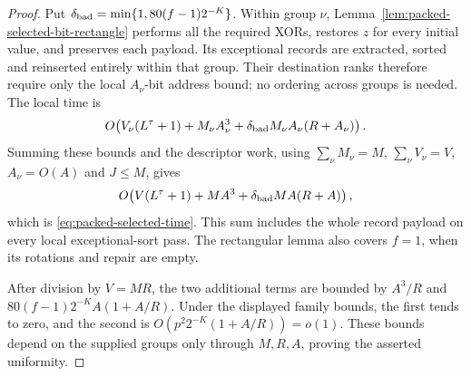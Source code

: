 \documentclass[11pt]{article}
\theoremstyle{definition}
\begin{document}
\begin{proof}
Put $\delta_{\rm bad}=\min\{1,80(f-1)2^{-K}\}$. Within group $\nu$,
Lemma~\ref{lem:packed-selected-bit-rectangle} performs all the required
XORs, restores $z$ for every initial value, and preserves each payload.
Its exceptional records are extracted, sorted and reinserted entirely
within that group. Their destination ranks therefore require only the
local $A_\nu$-bit address bound; no ordering across groups is needed.
The local time is
\[
 O\!\left(V_\nu(L^\tau+1)+M_\nu A_\nu^3+
       \delta_{\rm bad}M_\nu A_\nu(R+A_\nu)\right).
\]
Summing these bounds and the descriptor work, using
$\sum_\nu M_\nu=M$, $\sum_\nu V_\nu=V$, $A_\nu=O(A)$ and $J\le M$,
gives
\[
 O\!\left(V(L^\tau+1)+MA^3+
       \delta_{\rm bad}MA(R+A)\right),
\]
which is \eqref{eq:packed-selected-time}. This sum includes the whole
record payload on every local exceptional-sort pass. The rectangular
lemma also covers $f=1$, when its rotations and repair are empty.

After division by $V=MR$, the two additional terms are bounded by
$A^3/R$ and $80(f-1)2^{-K}A(1+A/R)$. Under the displayed family bounds,
the first tends to zero, and the second is
$O(p^2 2^{-K}(1+A/R))=o(1)$. These bounds depend on the supplied groups
only through $M,R,A$, proving the asserted uniformity.
\end{proof}
 

\end{document}
